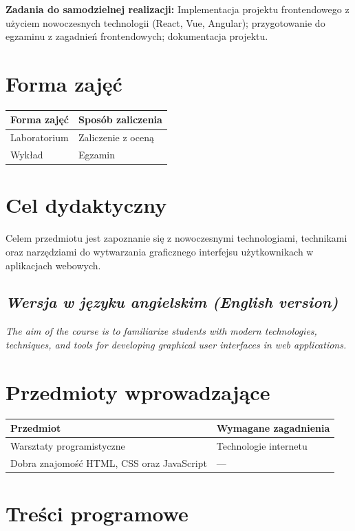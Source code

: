 \documentclass[12pt, a4paper]{article}
\begin{document}
\vspace{4pt}
\noindent\textbf{Zadania do samodzielnej realizacji:} Implementacja projektu frontendowego z użyciem nowoczesnych technologii (React, Vue, Angular); przygotowanie do egzaminu z zagadnień frontendowych; dokumentacja projektu.

\section{Forma zajęć}

\begin{tabular}{ll}
  \hline
  \textbf{Forma zajęć} & \textbf{Sposób zaliczenia} \\
  \hline
  Laboratorium & Zaliczenie z oceną \\
  Wykład & Egzamin \\
  \hline
\end{tabular}

\section{Cel dydaktyczny}

Celem przedmiotu jest zapoznanie się z nowoczesnymi technologiami, technikami oraz narzędziami do wytwarzania graficznego interfejsu użytkownikach w aplikacjach webowych.

\subsection*{\textit{Wersja w języku angielskim (English version)}}

\textit{The aim of the course is to familiarize students with modern technologies, techniques, and tools for developing graphical user interfaces in web applications.}


\section{Przedmioty wprowadzające}

\begin{tabularx}{\textwidth}{lX}
  \hline
  \textbf{Przedmiot} & \textbf{Wymagane zagadnienia} \\
  \hline
  Warsztaty programistyczne & Technologie internetu \\
  Dobra znajomość HTML, CSS oraz JavaScript & --- \\
  \hline
\end{tabularx}

\section{Treści programowe}
\end{document}
